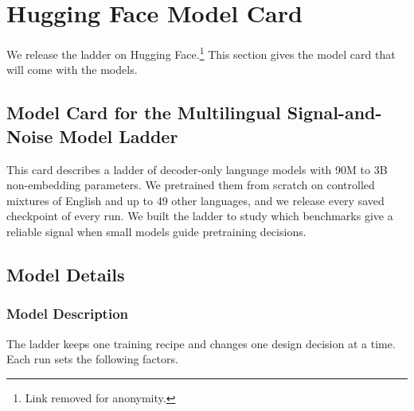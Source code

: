 \section{Hugging Face Model Card}
\label{app:hf_model_card}

We release the ladder on Hugging Face.\footnote{Link removed for anonymity.} This section gives the model card that will come with the models. %



\subsection*{Model Card for the Multilingual Signal-and-Noise Model Ladder}

This card describes a ladder of \nruns decoder-only language models with 90M to 3B non-embedding parameters. We pretrained them from scratch on controlled mixtures of English and up to 49 other languages, and we release every saved checkpoint of every run. We built the ladder to study which benchmarks give a reliable signal when small models guide pretraining decisions.

\subsection*{Model Details}

\subsubsection*{Model Description}

The ladder keeps one training recipe and changes one design decision at a time. Each run sets the following factors.

